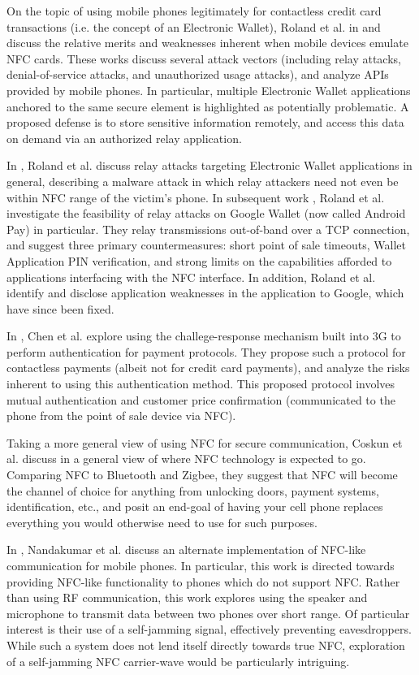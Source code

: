 On the topic of using mobile phones legitimately for contactless credit card transactions (i.e. the concept of an Electronic Wallet),
    Roland et al. in \cite{roland2012software} and \cite{roland2012practical} discuss the relative merits and weaknesses inherent when mobile devices emulate NFC cards.
These works discuss several attack vectors (including relay attacks, denial-of-service attacks, and unauthorized usage attacks),
    and analyze APIs provided by mobile phones.
In particular, multiple Electronic Wallet applications anchored to the same secure element is highlighted as potentially problematic.
A proposed defense is to store sensitive information remotely, and access this data on demand via an authorized relay application.

In \cite{roland2012relay}, Roland et al. discuss relay attacks targeting Electronic Wallet applications in general,
    describing a malware attack in which relay attackers need not even be within NFC range of the victim's phone.
In subsequent work \cite{roland2013applying}, Roland et al. investigate the feasibility of relay attacks on Google Wallet (now called Android Pay) in particular.
They relay transmissions out-of-band over a TCP connection, and suggest three primary countermeasures:
    short point of sale timeouts, Wallet Application PIN verification, and strong limits on the capabilities afforded to applications interfacing with the NFC interface.
In addition, Roland et al. identify and disclose application weaknesses in the application to Google, which have since been fixed.

In \cite{chen2010using}, Chen et al. explore using the challege-response mechanism built into 3G to perform authentication for payment protocols.
They propose such a protocol for contactless payments (albeit not for credit card payments), and analyze the risks inherent to using this authentication method.
This proposed protocol involves mutual authentication and customer price confirmation (communicated to the phone from the point of sale device via NFC).

Taking a more general view of using NFC for secure communication,
    Coskun et al. discuss in \cite{Coskun2013} a general view of where NFC technology is expected to go.
Comparing NFC to Bluetooth and Zigbee, they suggest that NFC will become the channel of choice for anything from unlocking doors, payment systems, identification, etc.,
    and posit an end-goal of having your cell phone replaces everything you would otherwise need to use for such purposes.

In \cite{nandakumar2013dhwani}, Nandakumar et al. discuss an alternate implementation of NFC-like communication for mobile phones.
In particular, this work is directed towards providing NFC-like functionality to phones which do not support NFC.
Rather than using RF communication, this work explores using the speaker and microphone to transmit data between two phones over short range.
Of particular interest is their use of a self-jamming signal, effectively preventing eavesdroppers.
While such a system does not lend itself directly towards true NFC, exploration of a self-jamming NFC carrier-wave would be particularly intriguing.
